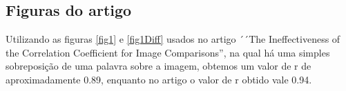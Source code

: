 \documentclass[10pt,a4paper]{article}
\begin{document}
\subsection{Figuras do artigo }
Utilizando as figuras \ref{fig1} e \ref{fig1Diff} usados no artigo ´´The Ineffectiveness of the Correlation
Coefficient for Image Comparisons'', na qual há uma simples
sobreposição de uma palavra sobre a imagem, obtemos um valor de r de
aproximadamente 0.89, enquanto no artigo o valor de r obtido vale
0.94. 
\begin{figure}[h!]
  \begin{center}
    \hspace{10mm}

\end{center}
\end{figure}
\end{document}

